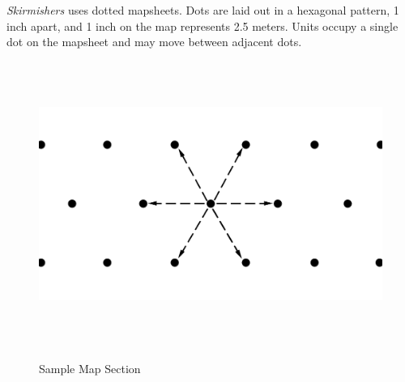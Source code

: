 \emph{Skirmishers} uses dotted mapsheets.
Dots are laid out in a hexagonal pattern, 1 inch apart, and 1 inch on the map represents 2.5 meters.
Units occupy a single dot on the mapsheet and may move between adjacent dots.

\begin{figure}[!h]
  \centering
  \includegraphics[alt='Sample dotted mapsheet', width=6.5in, height=3.66in]{img/map.png}
  \caption*{Sample Map Section}
\end{figure}
